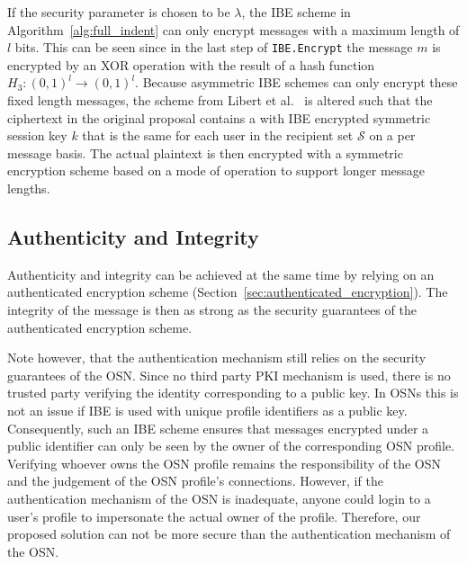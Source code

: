 If the security parameter is chosen to be $\lambda$, the IBE scheme in Algorithm~\ref{alg:full_indent} can only encrypt messages with a maximum length of $l$ bits. This can be seen since in the last step of \texttt{IBE.Encrypt} the message $m$ is encrypted by an XOR operation with the result of a hash function $H_3: \left( 0,1 \right)^l \rightarrow \left( 0,1 \right)^l$. Because asymmetric IBE schemes can only encrypt these fixed length messages, the scheme from Libert et al.~\cite{art:LibertPQ12} is altered such that the ciphertext in the original proposal contains a with IBE encrypted symmetric session key $k$ that is the same for each user in the recipient set $\mathcal{S}$ on a per message basis. The actual plaintext is then encrypted with a symmetric encryption scheme based on a mode of operation to support longer message lengths.

\subsection{Authenticity and Integrity}
Authenticity and integrity can be achieved at the same time by relying on an authenticated encryption scheme (Section~\ref{sec:authenticated_encryption}). The integrity of the message is then as strong as the security guarantees of the authenticated encryption scheme. 

Note however, that the authentication mechanism still relies on the security guarantees of the OSN. Since no third party PKI mechanism is used, there is no trusted party verifying the identity corresponding to a public key. In OSNs this is not an issue if IBE is used with unique profile identifiers as a public key. Consequently, such an IBE scheme ensures that messages encrypted under a public identifier can only be seen by the owner of the corresponding OSN profile. Verifying whoever owns the OSN profile remains the responsibility of the OSN and the judgement of the OSN profile's connections. However, if the authentication mechanism of the OSN is inadequate, anyone could login to a user's profile to impersonate the actual owner of the profile. Therefore, our proposed solution can not be more secure than the authentication mechanism of the OSN.

